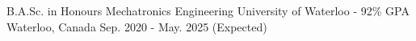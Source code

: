 

\begin{cventries}

  \educationentry
    {B.A.Sc. in Honours Mechatronics Engineering} %
    {University of Waterloo - 92\% GPA} %
    {Waterloo, Canada} %
    {Sep. 2020 - May. 2025 (Expected)} %
\end{cventries}
